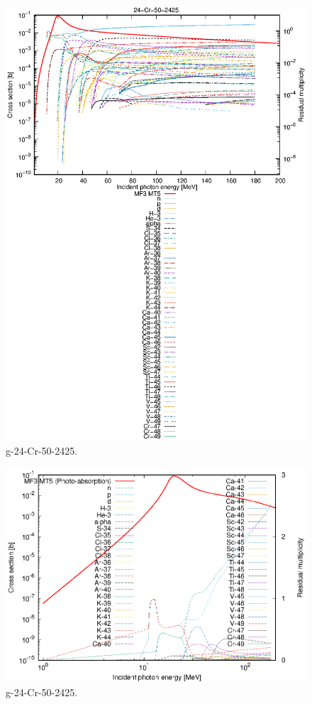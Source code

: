 \begin{figure}
 \includegraphics[width=\linewidth]{eps/g_24-Cr-50_2425.eps}
  \caption{g-24-Cr-50-2425.}
\end{figure}
\newpage \clearpage

\begin{figure}
 \includegraphics[width=\linewidth]{eps-log/g_24-Cr-50_2425.eps}
 \caption{g-24-Cr-50-2425.}
\end{figure}
\newpage \clearpage

